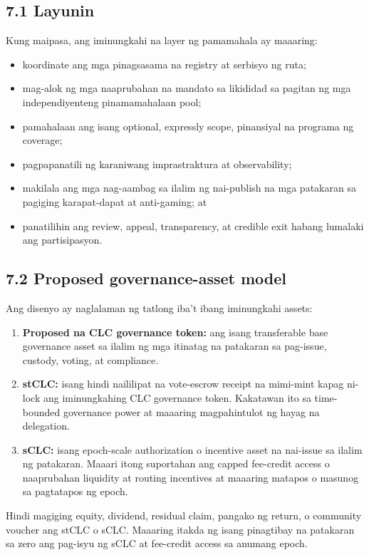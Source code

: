 \documentclass[11pt]{article}
\begin{document}
\subsection*{7.1 Layunin}

Kung maipasa, ang iminungkahi na layer ng pamamahala ay maaaring:

\begin{itemize}[leftmargin=*]
\item koordinate ang mga pinagsasama na registry at serbisyo ng ruta;
\item mag-alok ng mga naaprubahan na mandato sa likididad sa pagitan ng mga independiyenteng pinamamahalaan pool;
\item pamahalaan ang isang optional, expressly scope, pinansiyal na programa ng coverage;
\item pagpapanatili ng karaniwang imprastraktura at observability;
\item makilala ang mga nag-aambag sa ilalim ng nai-publish na mga patakaran sa pagiging karapat-dapat at anti-gaming; at
\item panatilihin ang review, appeal, transparency, at credible exit habang lumalaki ang partisipasyon.
\end{itemize}
\subsection*{7.2 Proposed governance-asset model}

Ang disenyo ay naglalaman ng tatlong iba't ibang iminungkahi assets:

\begin{enumerate}[leftmargin=*]
\item \textbf{Proposed na CLC governance token:} ang isang transferable base governance asset sa ilalim ng mga itinatag na patakaran sa pag-issue, custody, voting, at compliance.
\item \textbf{stCLC:} isang hindi naililipat na vote-escrow receipt na mimi-mint kapag ni-lock ang iminungkahing CLC governance token. Kakatawan ito sa time-bounded governance power at maaaring magpahintulot ng hayag na delegation.
\item \textbf{sCLC:} isang epoch-scale authorization o incentive asset na nai-issue sa ilalim ng patakaran. Maaari itong suportahan ang capped fee-credit access o naaprubahan liquidity at routing incentives at maaaring matapos o masunog sa pagtatapos ng epoch.
\end{enumerate}
Hindi magiging equity, dividend, residual claim, pangako ng return, o community voucher ang stCLC o sCLC. Maaaring itakda ng isang pinagtibay na patakaran sa zero ang pag-isyu ng sCLC at fee-credit access sa anumang epoch.
\end{document}
